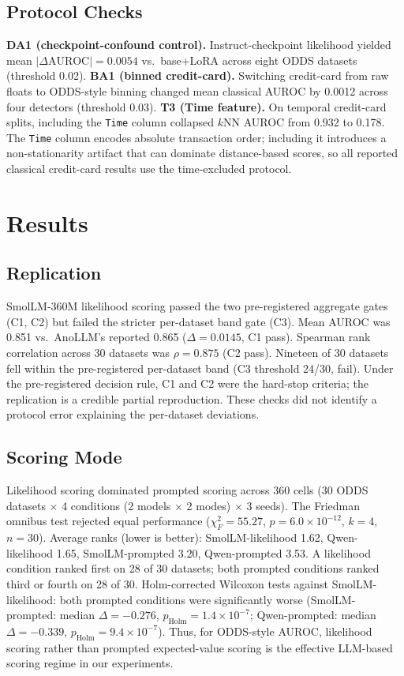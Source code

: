 \documentclass[conference]{IEEEtran}
\begin{document}
\subsection{Protocol Checks}
\textbf{DA1 (checkpoint-confound control).} Instruct-checkpoint likelihood yielded mean $|\Delta\mathrm{AUROC}|=0.0054$ vs.\ base+LoRA across eight ODDS datasets (threshold 0.02).
\textbf{BA1 (binned credit-card).} Switching credit-card from raw floats to ODDS-style binning changed mean classical AUROC by 0.0012 across four detectors (threshold 0.03).
\textbf{T3 (Time feature).} On temporal credit-card splits, including the \texttt{Time} column collapsed $k$NN AUROC from 0.932 to 0.178.
The \texttt{Time} column encodes absolute transaction order; including it introduces a non-stationarity artifact that can dominate distance-based scores, so all reported classical credit-card results use the time-excluded protocol.

\section{Results}\label{sec:results}

\subsection{Replication}\label{subsec:replication}
SmolLM-360M likelihood scoring passed the two pre-registered aggregate gates (C1, C2) but failed the stricter per-dataset band gate (C3).
Mean AUROC was 0.851 vs.\ AnoLLM's reported 0.865 ($\Delta=0.0145$, C1 pass).
Spearman rank correlation across 30 datasets was $\rho=0.875$ (C2 pass).
Nineteen of 30 datasets fell within the pre-registered per-dataset band (C3 threshold 24/30, fail).
Under the pre-registered decision rule, C1 and C2 were the hard-stop criteria; the replication is a credible partial reproduction.
These checks did not identify a protocol error explaining the per-dataset deviations.

\subsection{Scoring Mode}
Likelihood scoring dominated prompted scoring across 360 cells (30 ODDS datasets $\times$ 4 conditions (2 models $\times$ 2 modes) $\times$ 3 seeds).
The Friedman omnibus test rejected equal performance ($\chi^2_F=55.27$, $p=6.0\times10^{-12}$, $k=4$, $n=30$).
Average ranks (lower is better): SmolLM-likelihood 1.62, Qwen-likelihood 1.65, SmolLM-prompted 3.20, Qwen-prompted 3.53.
A likelihood condition ranked first on 28 of 30 datasets; both prompted conditions ranked third or fourth on 28 of 30.
Holm-corrected Wilcoxon tests against SmolLM-likelihood: both prompted conditions were significantly worse (SmolLM-prompted: median $\Delta=-0.276$, $p_{\mathrm{Holm}}=1.4\times10^{-7}$; Qwen-prompted: median $\Delta=-0.339$, $p_{\mathrm{Holm}}=9.4\times10^{-7}$).
Thus, for ODDS-style AUROC, likelihood scoring rather than prompted expected-value scoring is the effective LLM-based scoring regime in our experiments.
\end{document}
